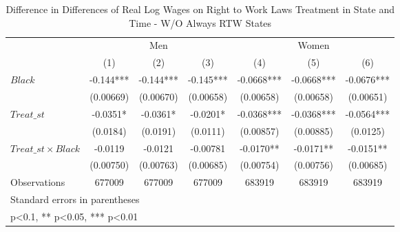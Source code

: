 \begin{table}[htbp]\centering
\def\sym#1{\ifmmode^{#1}\else\(^{#1}\)\fi}
\caption{Difference in Differences of Real Log Wages on Right to Work Laws Treatment in State and Time - W/O Always RTW States}
\begin{tabular}{l*{6}{c}}
\hline\hline
                    &\multicolumn{3}{c}{Men}                        &\multicolumn{3}{c}{Women}                      \\\cmidrule(lr){2-4}\cmidrule(lr){5-7}
                    &\multicolumn{1}{c}{(1)}   &\multicolumn{1}{c}{(2)}   &\multicolumn{1}{c}{(3)}   &\multicolumn{1}{c}{(4)}   &\multicolumn{1}{c}{(5)}   &\multicolumn{1}{c}{(6)}   \\
\hline
$ Black $           &      -0.144***&      -0.144***&      -0.145***&     -0.0668***&     -0.0668***&     -0.0676***\\
                    &   (0.00669)   &   (0.00670)   &   (0.00658)   &   (0.00658)   &   (0.00658)   &   (0.00651)   \\
[1em]
$ Treat\_{st} $      &     -0.0351*  &     -0.0361*  &     -0.0201*  &     -0.0368***&     -0.0368***&     -0.0564***\\
                    &    (0.0184)   &    (0.0191)   &    (0.0111)   &   (0.00857)   &   (0.00885)   &    (0.0125)   \\
[1em]
$ Treat\_{st} \times Black $&     -0.0119   &     -0.0121   &    -0.00781   &     -0.0170** &     -0.0171** &     -0.0151** \\
                    &   (0.00750)   &   (0.00763)   &   (0.00685)   &   (0.00754)   &   (0.00756)   &   (0.00685)   \\
\hline
Observations        &      677009   &      677009   &      677009   &      683919   &      683919   &      683919   \\
\hline\hline
\multicolumn{7}{l}{\footnotesize Standard errors in parentheses}\\
\multicolumn{7}{l}{\footnotesize * p<0.1, ** p<0.05, *** p<0.01}\\
\end{tabular}
\end{table}
